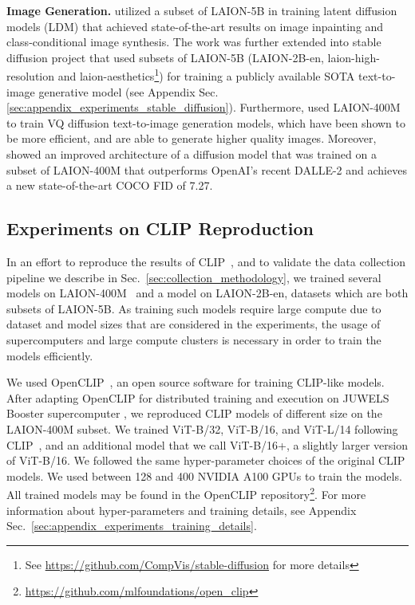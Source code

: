 \textbf{Image Generation.} 
\citet{LAION-400M-LD} utilized a subset of LAION-5B in training latent diffusion models (LDM) that achieved state-of-the-art results on image inpainting and class-conditional image synthesis. The work was further extended into stable diffusion project that used subsets of LAION-5B (LAION-2B-en, laion-high-resolution and laion-aesthetics\footnote{See \url{https://github.com/CompVis/stable-diffusion} for more details}) for training a publicly available SOTA text-to-image generative model (see Appendix Sec. \ref{sec:appendix_experiments_stable_diffusion}). Furthermore, \citet{LAION-400M-Vector} used LAION-400M to train VQ diffusion text-to-image generation models, which have been shown to be more efficient, and are able to generate higher quality images. Moreover, \citet{imagen} showed an improved architecture of a diffusion model that was trained on a subset of LAION-400M that outperforms OpenAI's recent DALLE-2 and achieves a new state-of-the-art COCO FID of 7.27.

\subsection{Experiments on CLIP Reproduction}

\label{subsec:clip_exp}

In an effort to reproduce the results of CLIP~\citep{radford2021learning}, and to validate the data collection pipeline we describe in Sec.~\ref{sec:collection_methodology}, we trained several models on LAION-400M~\citep{schuhmann2021laion} and a model on LAION-2B-en, datasets which are both subsets of LAION-5B. As training such models require large compute due to dataset and model sizes that are considered in the experiments, the usage of supercomputers and large compute clusters is necessary in order to train the models efficiently.

We used OpenCLIP~\citep{ilharco_gabriel_2021_5143773}, an open source software for training CLIP-like models. After adapting OpenCLIP for distributed training and execution on JUWELS Booster supercomputer \cite{JUWELSBooster2020}, we reproduced CLIP models of different size on the LAION-400M subset. We trained ViT-B/32, ViT-B/16, and ViT-L/14 following CLIP~\citep{radford2021learning}, and an additional model that we call ViT-B/16+, a slightly larger version of ViT-B/16. We followed the same hyper-parameter choices of the original CLIP models. We used between 128 and 400 NVIDIA A100 GPUs to train the models. All trained models may be found in the OpenCLIP repository\footnote{\url{https://github.com/mlfoundations/open_clip}}.
For more information about hyper-parameters and training details, see Appendix Sec.~\ref{sec:appendix_experiments_training_details}.

